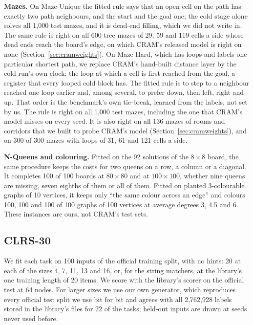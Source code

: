 \documentclass[10pt]{article}
\begin{document}
\textbf{Mazes.} On Maze-Unique the fitted rule says that an open cell on the path has exactly two path neighbours, and
the start and the goal one; the cold stage alone solves all 1,000 test mazes, and it is dead-end filling,
which we did not write in. The same rule is right on all 600 tree mazes of 29, 59 and 119 cells a side whose
dead ends reach the board's edge, on which CRAM's released model is right on none (Section~\ref{sec:cramweights}). On
Maze-Hard, which has loops and labels one particular shortest path, we replace CRAM's hand-built distance layer by the
cold run's own clock: the loop at which a cell is first reached from the goal, a register that every looped cold block
has. The fitted rule is to step to a neighbour reached one loop earlier and, among several, to prefer down, then left,
right and up. That order is the benchmark's own tie-break, learned from the labels, not set by us. The rule is right on
all 1,000 test mazes, including the one that CRAM's model misses on every seed. It is also right on all
136 mazes of rooms and corridors that we built to probe CRAM's model (Section~\ref{sec:cramweights}), and on
300 of 300 mazes with loops of 31, 61 and 121 cells a side.

\textbf{N-Queens and colouring.} Fitted on the 92 solutions of the $8\times8$ board, the same procedure keeps the costs
for two queens on a row, a column or a diagonal. It completes 100 of 100 boards at $80\times80$ and
at $100\times100$, whether nine queens are missing, seven eighths of them or all of them. Fitted on planted
3-colourable graphs of 10 vertices, it keeps only ``the same colour across an edge'' and colours
100, 100 and 100 of 100 graphs of 100 vertices at average degrees
3, 4.5 and 6. These instances are ours, not CRAM's test sets.

\subsection{CLRS-30}\label{sec:clrs}

We fit each task on 100 inputs of the official training split, with no hints: 20 at each of the
sizes 4, 7, 11, 13 and 16, or, for the string matchers, at the library's one training length of 20 items. We score with
the library's scorer on the official test at 64 nodes. For larger sizes we use our own generator, which reproduces every
official test split we use bit for bit and agrees with all 2,762,928 labels stored in the library's files for
22 of the tasks; held-out inputs are drawn at seeds never used before.
\end{document}
